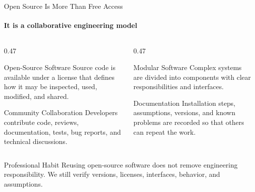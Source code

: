 \begin{frame}{Open Source Is More Than Free Access}
\framesubtitle{It is a collaborative engineering model}

\begin{columns}[T,onlytextwidth]
    \begin{column}{0.47\textwidth}
        \begin{block}{Open-Source Software}
            Source code is available under a license that defines how it may be
            inspected, used, modified, and shared.
        \end{block}

        \begin{block}{Community Collaboration}
            Developers contribute code, reviews, documentation, tests,
            bug reports, and technical discussions.
        \end{block}
    \end{column}
    \hfill
    \begin{column}{0.47\textwidth}
        \begin{block}{Modular Software}
            Complex systems are divided into components with clear responsibilities
            and interfaces.
        \end{block}

        \begin{block}{Documentation}
            Installation steps, assumptions, versions, and known problems are
            recorded so that others can repeat the work.
        \end{block}
    \end{column}
\end{columns}

\begin{exampleblock}{Professional Habit}
    Reusing open-source software does not remove engineering responsibility.
    We still verify versions, licenses, interfaces, behavior, and assumptions.
\end{exampleblock}
\end{frame}


